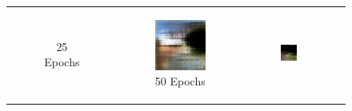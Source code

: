 \documentclass{article}
\begin{document}
\begin{figure}[H]
\begin{tabular}{cccc}
\begin{subfigure}{0.23\textwidth}
            \caption{25 Epochs}
        \end{subfigure} &
        \begin{subfigure}{0.23\textwidth}
            \centering
            \includegraphics[width=\linewidth]{world_epoch_50_11.png}
            \caption{50 Epochs}
        \end{subfigure} &
        \begin{subfigure}{0.23\textwidth}
            \centering
            \includegraphics[width=\linewidth]{world_epoch_100_11.png}

\end{subfigure}
\end{tabular}
\end{figure}
\end{document}
